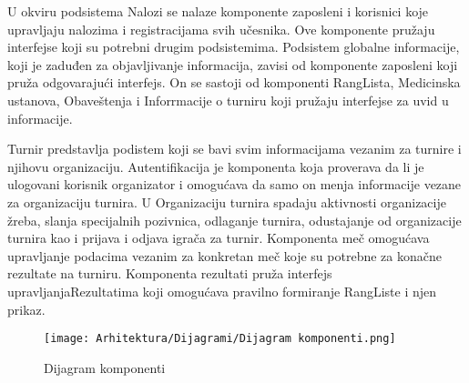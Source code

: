 \documentclass{article}
\begin{document}
U okviru podsistema Nalozi se nalaze komponente zaposleni i korisnici koje upravljaju nalozima i registracijama svih učesnika. Ove komponente pružaju interfejse koji su potrebni drugim podsistemima. Podsistem globalne informacije, koji je zaduđen za objavljivanje informacija, zavisi od komponente zaposleni koji pruža odgovarajući interfejs. On se sastoji od komponenti RangLista, Medicinska ustanova, Obaveštenja i Inforrmacije o turniru koji pružaju interfejse za uvid u informacije.

Turnir predstavlja podistem koji se bavi svim informacijama vezanim za turnire i njihovu organizaciju. Autentifikacija je komponenta koja proverava da li je ulogovani korisnik organizator i omogućava da samo on menja informacije vezane za organizaciju turnira. U Organizaciju turnira spadaju aktivnosti organizacije žreba, slanja specijalnih pozivnica, odlaganje turnira, odustajanje od organizacije turnira kao i prijava i odjava igrača za turnir. Komponenta meč omogućava upravljanje podacima vezanim za konkretan meč koje su potrebne za konačne rezultate na turniru. Komponenta rezultati pruža interfejs upravljanjaRezultatima koji omogućava pravilno formiranje RangListe i njen prikaz.


\begin{figure}[htbp]
        \begin{center}
            \texttt{[image: Arhitektura/Dijagrami/Dijagram komponenti.png]}
        \end{center}
    \caption{Dijagram komponenti}
    \end{figure}
\end{document}
